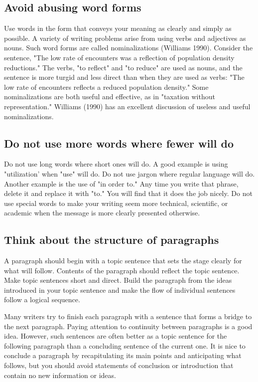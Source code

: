 \documentclass[11pt]{article}
\begin{document}
\subsection{Avoid abusing word forms}

Use words in the form that conveys your meaning as clearly and simply as possible. A variety of writing problems arise from using verbs and adjectives as nouns. Such word forms are called nominalizations (Williams 1990). Consider the sentence, "The low rate of encounters was a reflection of population density reductions." The verbs, "to reflect" and "to reduce" are used as nouns, and the sentence is more turgid and less direct than when they are used as verbs: "The low rate of encounters reflects a reduced population density." Some nominalizations are both useful and effective, as in "taxation without representation." Williams (1990) has an excellent discussion of useless and useful nominalizations.

\subsection{Do not use more words where fewer will do}
Do not use long words where short ones will do. A good example is using "utilization' when "use" will do. Do not use jargon where regular language will do. Another example is the use of "in order to." Any time you write that phrase, delete it and replace it with "to." You will find that it does the job nicely. Do not use special words to make your writing seem more technical, scientific, or academic when the message is more clearly presented otherwise.


\subsection{Think about the structure of paragraphs}

A paragraph should begin with a topic sentence that sets the stage clearly for what will follow. Contents of the paragraph should reflect the topic sentence. Make topic sentences short and direct. Build the paragraph from the ideas introduced in your topic sentence and make the flow of individual sentences follow a logical sequence.

Many writers try to finish each paragraph with a sentence that forms a bridge to the next paragraph. Paying attention to continuity between paragraphs is a good idea. However, such sentences are often better as a topic sentence for the following paragraph than a concluding sentence of the current one. It is nice to conclude a paragraph by recapitulating its main points and anticipating what follows, but you should avoid statements of conclusion or introduction that contain no new information or ideas.
\end{document}

